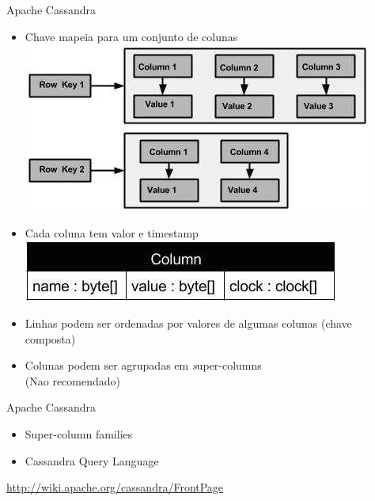 \begin{frame}{Apache Cassandra}
\begin{itemize}
\item Chave mapeia para um conjunto de colunas
\includegraphics[width=.7\textwidth]{images/cass_column_family}

\item Cada coluna tem valor e timestamp
\includegraphics[width=.7\textwidth]{images/cass_column}


\item Linhas podem ser ordenadas por valores de algumas colunas (chave composta)

\item Colunas podem ser agrupadas em {\emph super-columns}\\
(Nao recomendado)

\end{itemize}
\end{frame}




\begin{frame}{Apache Cassandra}
\begin{itemize}
\item Super-column families

%           

\item Cassandra Query Language
\end{itemize}

\url{http://wiki.apache.org/cassandra/FrontPage}
\end{frame}



